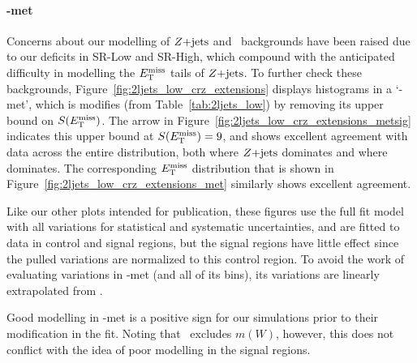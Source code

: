 \paragraph{\crz-met}
Concerns about our modelling of $Z\mathrm{+jets}$ and \diboson\ backgrounds have been
raised due to our deficits in SR-Low and SR-High, which compound with the
anticipated difficulty in modelling the $E_\mathrm{T}^\mathrm{miss}$ tails of $Z\mathrm{+jets}$.
To further check these backgrounds, Figure~\ref{fig:2ljets_low_crz_extensions}
displays histograms in a `\crz-met', which is modifies \crz
(from Table~\ref{tab:2ljets_low}) by removing its upper bound on $S(E_\mathrm{T}^\mathrm{miss})$.
The arrow in Figure~\ref{fig:2ljets_low_crz_extensions_metsig} indicates this
upper bound at $S(E_\mathrm{T}^\mathrm{miss}) = 9$, and shows excellent agreement with data across
the entire distribution, both where $Z\mathrm{+jets}$ dominates and where \diboson
dominates.
The corresponding $E_\mathrm{T}^\mathrm{miss}$ distribution that is shown in
Figure~\ref{fig:2ljets_low_crz_extensions_met}
similarly shows excellent agreement.

Like our other plots intended for publication, these figures use the full fit
model with all variations for statistical and systematic uncertainties,
and are fitted to data in control and signal regions, but the signal regions
have little effect since the pulled variations are normalized to this control
region.
To avoid the work of evaluating variations in \crz-met (and all of its bins),
its variations are linearly extrapolated from \crz.

Good modelling in \crz-met is a positive sign for our simulations prior to
their modification in the fit.
Noting that \crz\ excludes $m(W)$, however, this does not conflict with the idea
of poor modelling in the signal regions.

